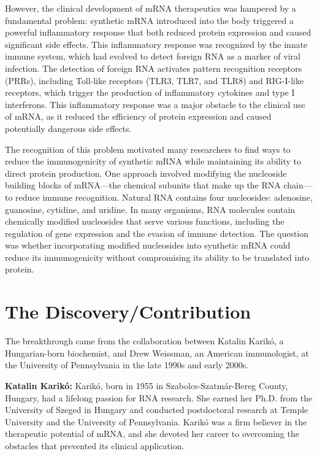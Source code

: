 However, the clinical development of mRNA therapeutics was hampered by a fundamental problem: synthetic mRNA introduced into the body triggered a powerful inflammatory response that both reduced protein expression and caused significant side effects. This inflammatory response was recognized by the innate immune system, which had evolved to detect foreign RNA as a marker of viral infection. The detection of foreign RNA activates pattern recognition receptors (PRRs), including Toll-like receptors (TLR3, TLR7, and TLR8) and RIG-I-like receptors, which trigger the production of inflammatory cytokines and type I interferons. This inflammatory response was a major obstacle to the clinical use of mRNA, as it reduced the efficiency of protein expression and caused potentially dangerous side effects.

The recognition of this problem motivated many researchers to find ways to reduce the immunogenicity of synthetic mRNA while maintaining its ability to direct protein production. One approach involved modifying the nucleoside building blocks of mRNA---the chemical subunits that make up the RNA chain---to reduce immune recognition. Natural RNA contains four nucleosides: adenosine, guanosine, cytidine, and uridine. In many organisms, RNA molecules contain chemically modified nucleosides that serve various functions, including the regulation of gene expression and the evasion of immune detection. The question was whether incorporating modified nucleosides into synthetic mRNA could reduce its immunogenicity without compromising its ability to be translated into protein.

\section{The Discovery/Contribution}

The breakthrough came from the collaboration between Katalin Karik\'o, a Hungarian-born biochemist, and Drew Weissman, an American immunologist, at the University of Pennsylvania in the late 1990s and early 2000s.

\textbf{Katalin Karik\'o:} Karik\'o, born in 1955 in Szabolcs-Szatm\'ar-Bereg County, Hungary, had a lifelong passion for RNA research. She earned her Ph.D. from the University of Szeged in Hungary and conducted postdoctoral research at Temple University and the University of Pennsylvania. Karik\'o was a firm believer in the therapeutic potential of mRNA, and she devoted her career to overcoming the obstacles that prevented its clinical application.

